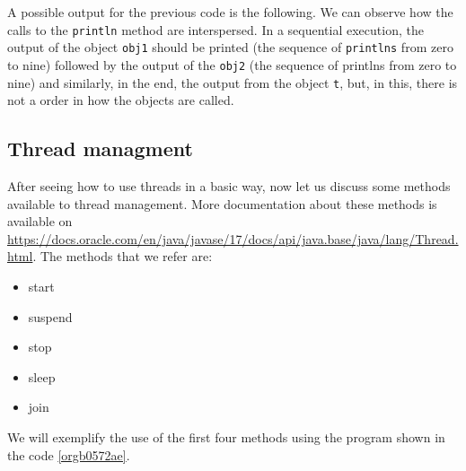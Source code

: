 \documentclass{latex/classes/thesis}
\begin{document}
A possible output for the previous code is the following. We can observe how
the calls to the \texttt{println} method are interspersed. In a sequential execution,
the output of the object \texttt{obj1} should be printed (the sequence of \texttt{printlns}
from zero to nine) followed by the output of the \texttt{obj2} (the sequence of
printlns from zero to nine) and similarly, in the end, the output from the
object \texttt{t}, but, in this, there is not a order in how the objects are
called.

\subsection{Thread managment}
\label{sec:org0b4ff1c}

After seeing how to use threads in a basic way, now let us discuss some
methods available to thread management. More documentation about these
methods is available on
\url{https://docs.oracle.com/en/java/javase/17/docs/api/java.base/java/lang/Thread.html}.
The methods that we refer are:

\begin{itemize}
\item start
\item suspend
\item stop
\item sleep
\item join
\end{itemize}

We will exemplify the use of the first four methods using the program shown
in the code \ref{orgb0572ae}.
\end{document}
